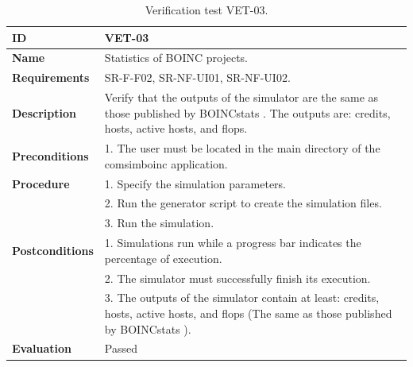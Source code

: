 \begin{center}
\begin{table}[htb]
\centering
\begin{tabular}{@{}p{2.5cm} p{13cm}@{}} 
\toprule
\textbf{ID} 					& VET-03 \\
\midrule
\textbf{Name} 				& Statistics of BOINC projects. \\
\midrule
\textbf{Requirements} 		& SR-F-F02, SR-NF-UI01, SR-NF-UI02. \\
\midrule
\textbf{Description} 		& Verify that the outputs of the simulator are the same as those published by BOINCstats \cite{BOINC2016}. The outputs are: credits, hosts, active hosts, and \acrshort{flops}.\\
\midrule
\textbf{Preconditions}		& 1. The user must be located in the main directory of the \gls{comsimboinc} application. \\
\midrule
\textbf{Procedure}			& 1. Specify the simulation parameters.\\
							& 2. Run the generator script to create the simulation files.\\
							& 3. Run the simulation.\\
\midrule
\textbf{Postconditions} 		& 1. Simulations run while a progress bar indicates the percentage of execution. \\
							& 2. The simulator must successfully finish its execution. \\
							& 3. The outputs of the simulator contain at least: credits, hosts, active hosts, and \acrshort{flops} (The same as those published by BOINCstats \cite{BOINC2016}). \\
\midrule
\textbf{Evaluation} 			& Passed \\
\bottomrule
\end{tabular}
\caption{Verification test VET-03.}
\label{tab:vet03}
\end{table}
\end{center}


